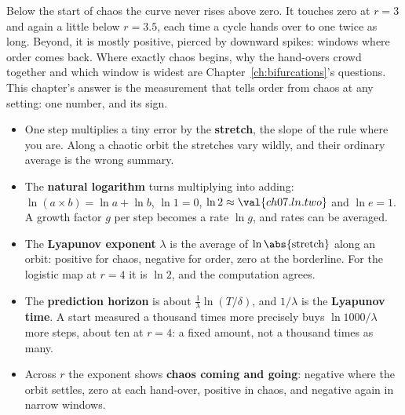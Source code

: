 \noindent
Below the start of chaos the curve never rises above zero. It touches zero
at $r = 3$ and again a little below $r = \num{3.5}$, each time a cycle hands
over to one twice as long. Beyond, it is mostly positive, pierced by
downward spikes: windows where order comes back. Where exactly chaos begins,
why the hand-overs crowd together and which window is widest are
Chapter~\ref{ch:bifurcations}'s questions. This chapter's answer is the
measurement that tells order from chaos at any setting: one number, and its
sign.

\begin{summarybox}
\begin{itemize}
\item One step multiplies a tiny error by the \textbf{stretch}, the slope of
  the rule where you are. Along a chaotic orbit the stretches vary wildly,
  and their ordinary average is the wrong summary.
\item The \textbf{natural logarithm} turns multiplying into adding:
  $\ln(a \times b) = \ln a + \ln b$, $\ln 1 = 0$, $\ln 2 \approx
  \val{ch07.ln.two}$ and $\ln e = 1$. A growth factor $g$ per step becomes a
  rate $\ln g$, and rates can be averaged.
\item The \textbf{Lyapunov exponent} $\lambda$ is the average of
  $\ln\abs{\text{stretch}}$ along an orbit: positive for chaos, negative for
  order, zero at the borderline. For the logistic map at $r = 4$ it is
  $\ln 2$, and the computation agrees.
\item The \textbf{prediction horizon} is about $\frac{1}{\lambda}\ln(T/\delta)$,
  and $1/\lambda$ is the \textbf{Lyapunov time}. A start measured a thousand
  times more precisely buys $\ln 1000/\lambda$ more steps, about ten at
  $r = 4$: a fixed amount, not a thousand times as many.
\item Across $r$ the exponent shows \textbf{chaos coming and going}:
  negative where the orbit settles, zero at each hand-over, positive in
  chaos, and negative again in narrow windows.
\end{itemize}
\end{summarybox}

\canyou

